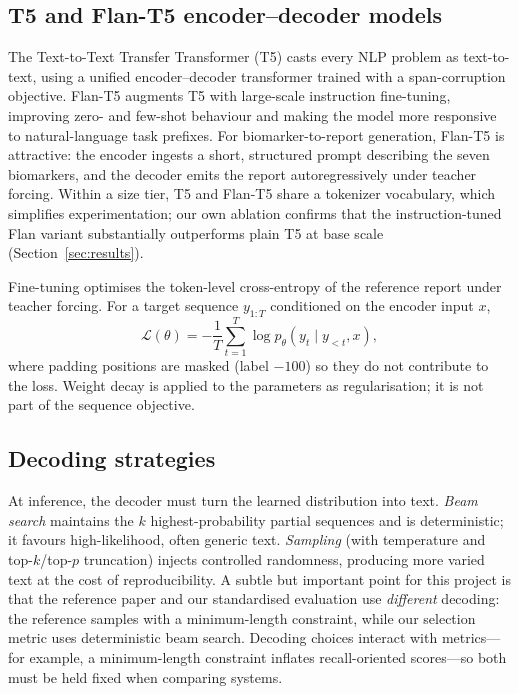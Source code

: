 \documentclass[11pt,twocolumn]{article}
\begin{document}
\subsection{T5 and Flan-T5 encoder--decoder models}
The Text-to-Text Transfer Transformer (T5) casts every NLP problem as text-to-text, using a
unified encoder--decoder transformer trained with a span-corruption objective. Flan-T5 augments
T5 with large-scale instruction fine-tuning, improving zero- and few-shot behaviour and making
the model more responsive to natural-language task prefixes. For biomarker-to-report generation,
Flan-T5 is attractive: the encoder ingests a short, structured prompt describing the seven
biomarkers, and the decoder emits the report autoregressively under teacher forcing. Within a
size tier, T5 and Flan-T5 share a tokenizer vocabulary, which simplifies experimentation; our
own ablation confirms that the instruction-tuned Flan variant substantially outperforms plain
T5 at base scale (Section~\ref{sec:results}).

Fine-tuning optimises the token-level cross-entropy of the reference report under teacher
forcing. For a target sequence $y_{1:T}$ conditioned on the encoder input $x$,
\begin{equation}
\mathcal{L}(\theta) = -\frac{1}{T}\sum_{t=1}^{T} \log p_\theta\!\left(y_t \mid y_{<t}, x\right),
\end{equation}
where padding positions are masked (label $-100$) so they do not contribute to the loss. Weight
decay is applied to the parameters as regularisation; it is not part of the sequence objective.

\subsection{Decoding strategies}
At inference, the decoder must turn the learned distribution into text. \emph{Beam search}
maintains the $k$ highest-probability partial sequences and is deterministic; it favours
high-likelihood, often generic text. \emph{Sampling} (with temperature and top-$k$/top-$p$
truncation) injects controlled randomness, producing more varied text at the cost of
reproducibility. A subtle but important point for this project is that the reference paper and our
standardised evaluation use \emph{different} decoding: the reference samples with a minimum-length
constraint, while our selection metric uses deterministic beam search. Decoding choices interact
with metrics---for example, a minimum-length constraint inflates recall-oriented scores---so both
must be held fixed when comparing systems.
\end{document}
